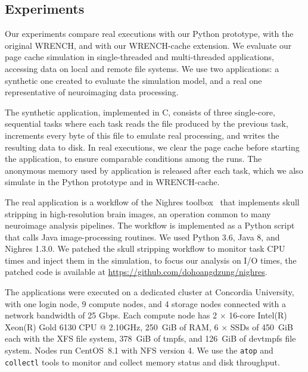 \documentclass[conference]{IEEEtran}
\newcommand{\wrench}{WRENCH\xspace}
\begin{document}
        \subsection{Experiments}

        Our experiments compare real executions with our Python prototype,
        with the original \wrench, and with our \wrench-cache extension. We
        evaluate our page cache simulation in single-threaded and
        multi-threaded applications, accessing data on local and remote
        file systems. We use two applications: a synthetic one created to
        evaluate the simulation model, and a real one representative of
        neuroimaging data processing.

        The synthetic application, implemented in C, consists of three single-core,
        sequential tasks where each task reads the file produced by the
        previous task, increments every byte of this file to emulate real
        processing, and writes the resulting data to disk. In real
        executions, we clear the page cache before starting the application,
        to ensure comparable conditions among the runs.
        The anonymous memory used by application
        is released after each task, which we also simulate in the Python prototype and in WRENCH-cache.
        
        The real application is a workflow of the Nighres
        toolbox~\cite{huntenburg2018nighres} that implements skull
        stripping in high-resolution brain images, an operation common to
        many neuroimage analysis pipelines. The workflow is implemented as a Python
        script that calls Java image-processing routines. We used Python
        3.6, Java 8, and Nighres 1.3.0. We patched the
        skull stripping workflow to monitor task CPU times and inject them
        in the simulation, to focus our analysis on I/O times, the patched code is 
        available at \url{https://github.com/dohoangdzung/nighres}. 

        The applications were executed on a dedicated cluster at
        Concordia University, with one login node, 9 compute nodes, and 4
        storage nodes connected with a network bandwidth of 25 Gbps. Each
        compute node has 2 $\times$ 16-core Intel(R) Xeon(R) Gold 6130 CPU
        @ 2.10GHz, 250~GiB of RAM, 6 $\times$ SSDs of 450~GiB each with the XFS
        file system, 378~GiB of tmpfs, and 126~GiB of devtmpfs file system.
        Nodes run CentOS~8.1 with NFS version 4. We use the \texttt{atop}
        and \texttt{collectl} tools to monitor and collect memory status
        and disk throughput.
\end{document}
